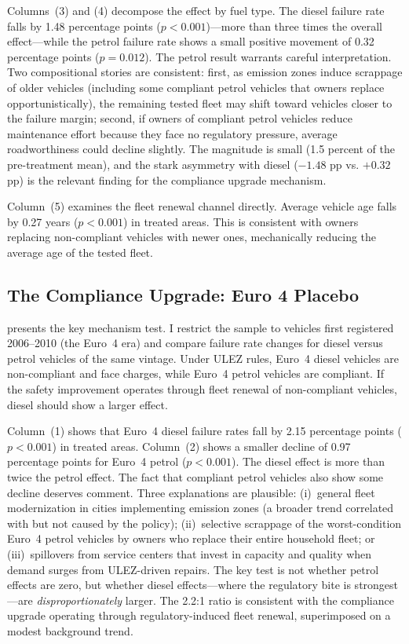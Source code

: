 \documentclass[12pt]{article}
\begin{document}
Columns~(3) and (4) decompose the effect by fuel type. The diesel failure rate falls by 1.48 percentage points ($p < 0.001$)---more than three times the overall effect---while the petrol failure rate shows a small positive movement of 0.32 percentage points ($p = 0.012$). The petrol result warrants careful interpretation. Two compositional stories are consistent: first, as emission zones induce scrappage of older vehicles (including some compliant petrol vehicles that owners replace opportunistically), the remaining tested fleet may shift toward vehicles closer to the failure margin; second, if owners of compliant petrol vehicles reduce maintenance effort because they face no regulatory pressure, average roadworthiness could decline slightly. The magnitude is small (1.5 percent of the pre-treatment mean), and the stark asymmetry with diesel ($-1.48$ pp vs. $+0.32$ pp) is the relevant finding for the compliance upgrade mechanism.

Column~(5) examines the fleet renewal channel directly. Average vehicle age falls by 0.27 years ($p < 0.001$) in treated areas. This is consistent with owners replacing non-compliant vehicles with newer ones, mechanically reducing the average age of the tested fleet.

\subsection{The Compliance Upgrade: Euro 4 Placebo}



 presents the key mechanism test. I restrict the sample to vehicles first registered 2006--2010 (the Euro~4 era) and compare failure rate changes for diesel versus petrol vehicles of the same vintage. Under ULEZ rules, Euro~4 diesel vehicles are non-compliant and face charges, while Euro~4 petrol vehicles are compliant. If the safety improvement operates through fleet renewal of non-compliant vehicles, diesel should show a larger effect.

Column~(1) shows that Euro~4 diesel failure rates fall by 2.15 percentage points ($p < 0.001$) in treated areas. Column~(2) shows a smaller decline of 0.97 percentage points for Euro~4 petrol ($p < 0.001$). The diesel effect is more than twice the petrol effect. The fact that compliant petrol vehicles also show some decline deserves comment. Three explanations are plausible: (i)~general fleet modernization in cities implementing emission zones (a broader trend correlated with but not caused by the policy); (ii)~selective scrappage of the worst-condition Euro~4 petrol vehicles by owners who replace their entire household fleet; or (iii)~spillovers from service centers that invest in capacity and quality when demand surges from ULEZ-driven repairs. The key test is not whether petrol effects are zero, but whether diesel effects---where the regulatory bite is strongest---are \textit{disproportionately} larger. The 2.2:1 ratio is consistent with the compliance upgrade operating through regulatory-induced fleet renewal, superimposed on a modest background trend.
\end{document}
